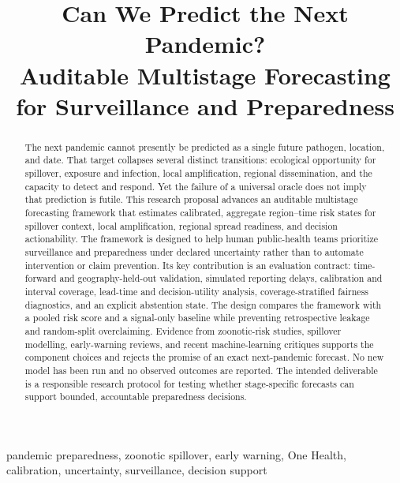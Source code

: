 \documentclass[conference]{IEEEtran}
\begin{document}
\title{Can We Predict the Next Pandemic?\\
Auditable Multistage Forecasting for Surveillance and Preparedness}

\author{
}

\maketitle

\begin{abstract}
The next pandemic cannot presently be predicted as a single future pathogen, location, and date. That target collapses several distinct transitions: ecological opportunity for spillover, exposure and infection, local amplification, regional dissemination, and the capacity to detect and respond. Yet the failure of a universal oracle does not imply that prediction is futile. This research proposal advances an auditable multistage forecasting framework that estimates calibrated, aggregate region--time risk states for spillover context, local amplification, regional spread readiness, and decision actionability. The framework is designed to help human public-health teams prioritize surveillance and preparedness under declared uncertainty rather than to automate intervention or claim prevention. Its key contribution is an evaluation contract: time-forward and geography-held-out validation, simulated reporting delays, calibration and interval coverage, lead-time and decision-utility analysis, coverage-stratified fairness diagnostics, and an explicit abstention state. The design compares the framework with a pooled risk score and a signal-only baseline while preventing retrospective leakage and random-split overclaiming. Evidence from zoonotic-risk studies, spillover modelling, early-warning reviews, and recent machine-learning critiques supports the component choices and rejects the promise of an exact next-pandemic forecast. No new model has been run and no observed outcomes are reported. The intended deliverable is a responsible research protocol for testing whether stage-specific forecasts can support bounded, accountable preparedness decisions.
\end{abstract}

\begin{IEEEkeywords}
pandemic preparedness, zoonotic spillover, early warning, One Health, calibration, uncertainty, surveillance, decision support
\end{IEEEkeywords}
\end{document}
